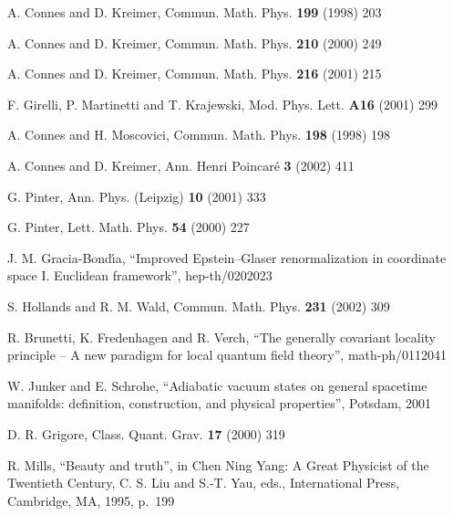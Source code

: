 \documentclass[a4paper,12pt]{article}
\providecommand{\1}{\mathbf{1}}         %
\providecommand{\7}{\dagger}            %
\providecommand{\8}{\bullet}            %
\renewcommand{\.}{\cdot}            %
\renewcommand{\:}{\colon}           %
\begin{document}
\begin{thebibliography}{92}
A. Connes and D. Kreimer,
Commun. Math. Phys. {\bf 199} (1998) 203

A. Connes and D. Kreimer,
Commun. Math. Phys. {\bf 210} (2000) 249

A. Connes and D. Kreimer,
Commun. Math. Phys. {\bf 216} (2001) 215

F. Girelli, P. Martinetti and T. Krajewski,
Mod. Phys. Lett. {\bf A16} (2001) 299

A. Connes and H. Moscovici,
Commun. Math. Phys. {\bf 198} (1998) 198

A. Connes and D. Kreimer,
Ann. Henri Poincar\'e {\bf 3} (2002) 411

G. Pinter,
Ann. Phys. (Leipzig) {\bf 10} (2001) 333

G. Pinter,
Lett. Math. Phys. {\bf 54} (2000) 227

J. M. Gracia-Bond\'{\i}a,
``Improved Epstein--Glaser renormalization in coordinate space I.
Euclidean framework'',
hep-th/0202023

S. Hollands and R. M. Wald,
Commun. Math. Phys. {\bf 231} (2002) 309

R. Brunetti, K. Fredenhagen and R. Verch,
``The generally covariant locality principle -- A new paradigm for
local quantum field theory'',
math-ph/0112041

W. Junker and E. Schrohe,
``Adiabatic vacuum states on general spacetime manifolds: definition,
construction, and physical properties'',
Potsdam, 2001

D. R. Grigore,
Class. Quant. Grav. {\bf 17} (2000) 319

R. Mills,
``Beauty and truth'',
in Chen Ning Yang: A Great Physicist of the Twentieth Century,
C. S. Liu and S.-T. Yau, eds.,
International Press, Cambridge, MA, 1995, p.~199

\end{thebibliography}
\end{document}
